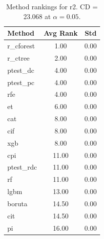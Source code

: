 \begin{table}[h]
\centering
\caption{Method rankings for r2. CD = 23.068 at $\alpha=0.05$.}
\label{tab:ranks_r2}
\begin{tabular}{lcc}
\toprule
Method & Avg Rank & Std \\
\midrule
r_cforest & 1.00 & 0.00 \\
r_ctree & 2.00 & 0.00 \\
ptest_dc & 4.00 & 0.00 \\
ptest_pc & 4.00 & 0.00 \\
rfe & 4.00 & 0.00 \\
et & 6.00 & 0.00 \\
cat & 8.00 & 0.00 \\
cif & 8.00 & 0.00 \\
xgb & 8.00 & 0.00 \\
cpi & 11.00 & 0.00 \\
ptest_rdc & 11.00 & 0.00 \\
rf & 11.00 & 0.00 \\
lgbm & 13.00 & 0.00 \\
boruta & 14.50 & 0.00 \\
cit & 14.50 & 0.00 \\
pi & 16.00 & 0.00 \\
\bottomrule
\end{tabular}
\end{table}